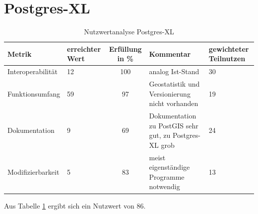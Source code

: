 \section{Postgres-XL}
\begin{table}[htp]
\centering
\small
\begin{tabular}{l|p{1.8cm}|c|p{3cm}|p{1.8cm}}
\textbf{Metrik} & \textbf{erreichter Wert} & \textbf{Erfüllung in \%} & \textbf{Kommentar} & \textbf{gewichteter Teilnutzen} \\ \hline
Interoperabilität & 12 & 100 & analog Ist-Stand & 30 \\ \hline
Funktionsumfang & 59 & 97 & Geostatistik und Versionierung nicht vorhanden & 19 \\ \hline
Dokumentation & 9 & 69 & Dokumentation zu PostGIS sehr gut, zu Postgres-XL grob & 24 \\ \hline
Modifizierbarkeit & 5 & 83 & meist eigenständige Programme notwendig & 13 \\
\end{tabular}
\caption{Nutzwertanalyse Postgres-XL}
\label{table:nutzwertanalyse-postgresxl}
\end{table}
Aus Tabelle \ref{table:nutzwertanalyse-postgresxl} ergibt sich ein Nutzwert von 86.




